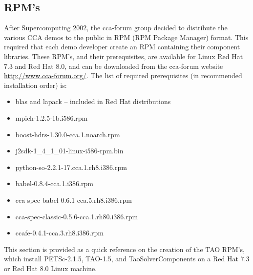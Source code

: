 \documentclass[doublespacing,12pt]{article}
\begin{document}

\subsection{RPM's}
After Supercomputing 2002, the cca-forum group decided to distribute
the various CCA demos to the public in RPM (RPM Package Manager)
format.  This required that each demo developer create an RPM
containing their component libraries.  These RPM's, and their
prerequisites,
are available for Linux 
Red Hat 7.3 and Red Hat 8.0, and can be downloaded from the cca-forum
website \url{http://www.cca-forum.org/}.  The list of required
prerequisites (in recommended installation order) is:
\begin{itemize}
\item blas and lapack -- included in Red Hat distributions
\item mpich-1.2.5-1b.i586.rpm
\item boost-hdrs-1.30.0-cca.1.noarch.rpm    
\item j2sdk-1\_4\_1\_01-linux-i586-rpm.bin 
\item python-so-2.2.1-17.cca.1.rh8.i386.rpm   
\item babel-0.8.4-cca.1.i386.rpm  
\item cca-spec-babel-0.6.1-cca.5.rh8.i386.rpm  
\item cca-spec-classic-0.5.6-cca.1.rh80.i386.rpm  
\item ccafe-0.4.1-cca.3.rh8.i386.rpm   
\end{itemize}

This section is
provided as a quick reference on the creation of the TAO RPM's, which
install PETSc-2.1.5, TAO-1.5, and TaoSolverComponents on a Red Hat 7.3 or
Red Hat 8.0 Linux machine.
\end{document}
